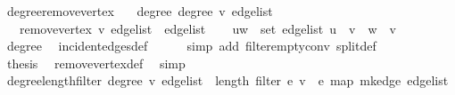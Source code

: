 \begin{isabellebody}
\endisatagproof
{\isafoldproof}%
%
\isadelimproof
\isanewline
%
\endisadelimproof
\isanewline
{}\isamarkupfalse%
\ degree{\isacharunderscore}{\kern0pt}{}{\isacharunderscore}{\kern0pt}remove{\isacharunderscore}{\kern0pt}vertex{\isacharcolon}{\kern0pt}\isanewline
\ \ \ degree{\isacharunderscore}{\kern0pt}{}{\isacharcolon}{\kern0pt}\ {\isachardoublequoteopen}degree\ v\ edge{\isacharunderscore}{\kern0pt}list\ {\isacharequal}{\kern0pt}\ {}{\isachardoublequoteclose}\isanewline
\ \ \ {\isachardoublequoteopen}remove{\isacharunderscore}{\kern0pt}vertex\ v\ edge{\isacharunderscore}{\kern0pt}list\ {\isacharequal}{\kern0pt}\ edge{\isacharunderscore}{\kern0pt}list{\isachardoublequoteclose}\isanewline
%
\isadelimproof
%
\endisadelimproof
%
\isatagproof
{}\isamarkupfalse%
{\isacharminus}{\kern0pt}\isanewline
\ \ \isamarkupfalse%
\ {\isachardoublequoteopen}{\isasymforall}{\isacharparenleft}{\kern0pt}u{\isacharcomma}{\kern0pt}w{\isacharparenright}{\kern0pt}\ {\isasymin}\ set\ edge{\isacharunderscore}{\kern0pt}list{\isachardot}{\kern0pt}\ u\ {\isasymnoteq}\ v\ {\isasymand}\ w\ {\isasymnoteq}\ v{\isachardoublequoteclose}\ \isamarkupfalse%
\ degree{\isacharunderscore}{\kern0pt}{}\ \isamarkupfalse%
\ incident{\isacharunderscore}{\kern0pt}edges{\isacharunderscore}{\kern0pt}def\isanewline
\ \ \ \ \isamarkupfalse%
\ {\isacharparenleft}{\kern0pt}simp\ add{\isacharcolon}{\kern0pt}\ filter{\isacharunderscore}{\kern0pt}empty{\isacharunderscore}{\kern0pt}conv\ split{\isacharunderscore}{\kern0pt}def{\isacharparenright}{\kern0pt}\isanewline
\ \ \isamarkupfalse%
\ \isamarkupfalse%
\ {\isacharquery}{\kern0pt}thesis\ \isamarkupfalse%
\ remove{\isacharunderscore}{\kern0pt}vertex{\isacharunderscore}{\kern0pt}def\ \isamarkupfalse%
\ simp\isanewline
{}\isamarkupfalse%
%
\endisatagproof
{\isafoldproof}%
%
\isadelimproof
\isanewline
%
\endisadelimproof
\isanewline
{}\isamarkupfalse%
\ degree{\isacharunderscore}{\kern0pt}length{\isacharunderscore}{\kern0pt}filter{\isacharcolon}{\kern0pt}\ {\isachardoublequoteopen}degree\ v\ edge{\isacharunderscore}{\kern0pt}list\ {\isacharequal}{\kern0pt}\ length\ {\isacharparenleft}{\kern0pt}filter\ {\isacharparenleft}{\kern0pt}{\isasymlambda}e{\isachardot}{\kern0pt}\ v\ {\isasymin}\ e{\isacharparenright}{\kern0pt}\ {\isacharparenleft}{\kern0pt}map\ mk{\isacharunderscore}{\kern0pt}edge\ edge{\isacharunderscore}{\kern0pt}list{\isacharparenright}{\kern0pt}{\isacharparenright}{\kern0pt}{\isachardoublequoteclose}\isanewline

\end{isabellebody}
